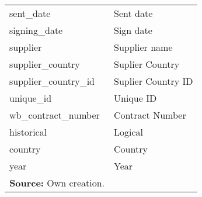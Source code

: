 \begin{table}[H]
\begin{center}
{\begin{tabular}{ll}
  sent\_date & Sent date \\ 
  signing\_date & Sign date \\ 
  supplier & Supplier name \\ 
  supplier\_country & Suplier Country \\ 
  supplier\_country\_id & Suplier Country ID \\ 
  unique\_id & Unique ID \\ 
  wb\_contract\_number & Contract Number \\ 
  historical & Logical \\ 
  country & Country \\ 
  year & Year \\ 
   \hline
   \footnotesize{\textbf{Source:} Own creation.} &

\end{tabular}}
\end{center}

\end{table}

